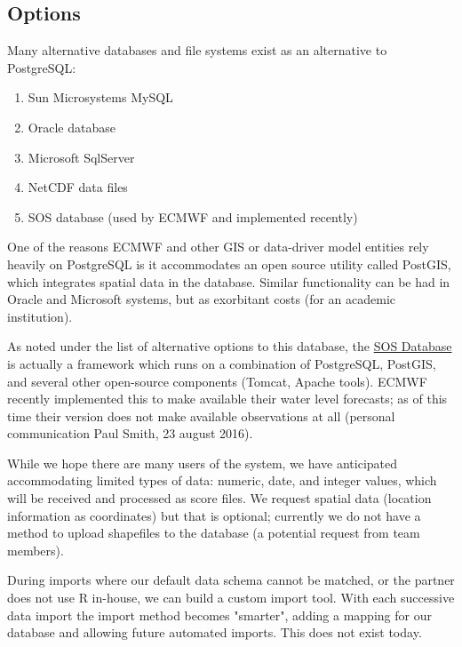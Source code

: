 \documentclass[logos,parttoc,morelanguage=french,morelanguage=german]{orsay-memoire}
\begin{document}
\subsection{Options}

Many alternative databases and file systems exist as an alternative to PostgreSQL:

\begin{enumerate}
\item Sun Microsystems MySQL
\item Oracle database
\item Microsoft SqlServer
\item NetCDF data files
\item SOS database (used by ECMWF and implemented recently)
\end{enumerate}

One of the reasons ECMWF and other GIS or data-driver model entities rely heavily on PostgreSQL is it accommodates an open source utility called PostGIS, which integrates spatial data in the database. Similar functionality can be had in Oracle and Microsoft systems, but as exorbitant costs (for an academic institution).

As noted under the list of alternative options to this database, the \href{http://52north.org/473-52-north-sos-4-3-7-now-available}{SOS Database} is actually a framework which runs on a combination of PostgreSQL, PostGIS, and several other open-source components (Tomcat, Apache tools). ECMWF recently implemented this to make available their water level forecasts; as of this time their version does not make available observations at all (personal communication Paul Smith, 23 august 2016).

%
%

While we hope there are many users of the system, we have anticipated accommodating limited types of data: numeric, date, and integer values, which will be received and processed as score files. We request spatial data (location information as coordinates) but that is optional; currently we do not have a method to upload shapefiles to the database (a potential request from team members).

During imports where our default data schema cannot be matched, or the partner does not use R in-house, we can build a custom import tool. With each successive data import the import method becomes "smarter", adding a mapping for our database and allowing future automated imports. This does not exist today.
%
%
\end{document}
